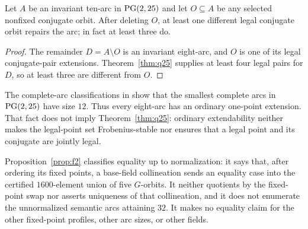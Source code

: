 \begin{corollary}
\label{cor:q25-uniform-repair}
Let $A$ be an invariant ten-arc in $\operatorname{PG}(2,25)$ and let $O\subseteq A$ be
any selected nonfixed conjugate orbit.  After deleting $O$, at least one
different legal conjugate orbit repairs the arc; in fact at least three do.
\end{corollary}

\begin{proof}
The remainder $D=A\setminus O$ is an invariant eight-arc, and $O$ is one
of its legal conjugate-pair extensions.  Theorem~\ref{thm:q25} supplies at
least four legal pairs for $D$, so at least three are different from $O$.
\end{proof}

The complete-arc classifications in
\cite{MarcuginiMilaniPambianco2007,CoolsaetSticker2009} show that the
smallest complete arcs in $\operatorname{PG}(2,25)$ have size $12$.  Thus every eight-arc
has an ordinary one-point extension.  That fact does not imply
Theorem~\ref{thm:q25}: ordinary extendability neither makes the legal-point
set Frobenius-stable nor ensures that a legal point and its conjugate are
jointly legal.

\begin{remark}\label{rem:census}
Proposition~\ref{prop:f2} classifies equality up to normalization: it says
that, after ordering its fixed points, a base-field collineation sends an
equality case into the certified $1600$-element union of five $G$-orbits.
It neither quotients by the fixed-point swap nor asserts uniqueness of that
collineation, and it does not enumerate the unnormalized semantic arcs
attaining $32$.  It makes no equality
claim for the other fixed-point profiles, other arc sizes, or other fields.
\end{remark}

